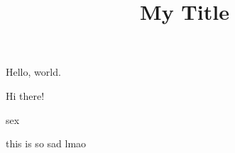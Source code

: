 \documentclass{article}
\title{My Title}
\begin{document}
Hello, world.

Hi there!


sex

this is so sad lmao
\end{document}
